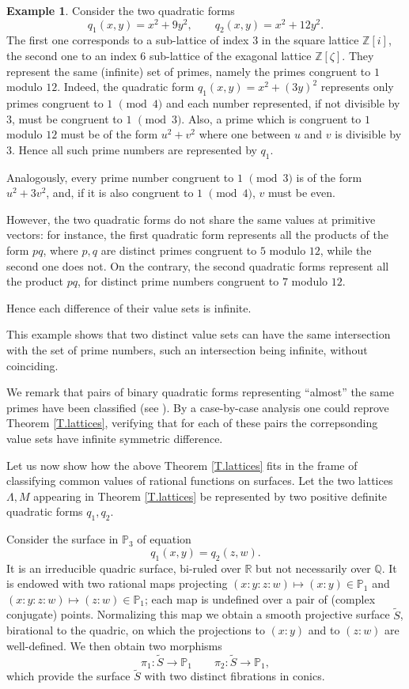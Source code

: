 \documentclass[leqno,12pt]{article} %
\def\Z{{{\mathbb Z}}}
\def\Q{{{\mathbb Q}}}
\def\R{{{\mathbb R}}}
\def\P{{{\mathbb P}}}
\theoremstyle{plain} %
\theoremstyle{definition} %
\newtheorem{example}[theorem]{\indent\sc Example}
\begin{document}
\begin{example}\label{Ex.same-primes}
Consider the two quadratic forms 
$$
q_1(x,y)= x^2+9y^2,\qquad q_2(x,y)=x^2+12y^2.
$$
The first one corresponds to a sub-lattice of index $3$ in the square lattice $\Z[i]$, the second one to an index $6$ sub-lattice of the exagonal lattice $\Z[\zeta]$. They represent the same (infinite) set of primes, namely the primes congruent to $1$ modulo $12$. Indeed, the quadratic form $q_1(x,y)=x^2+(3y)^2$ represents only primes congruent to $1$ $\pmod 4$ and each number represented, if not divisible by $3$, must be congruent to $1$ $\pmod 3$. Also, a prime which is congruent to $1$ modulo $12$ must be of the form $u^2+v^2$ where one between $u$ and $v$ is divisible by $3$. Hence all such prime numbers are represented by $q_1$.

Analogously, every prime number congruent to $1$ $\pmod 3$ is of the form $u^2+3v^2$, and, if it is also congruent to $1$ $\pmod 4$, $v$ must be even.


However, the two quadratic forms do not share the same values at primitive vectors: for instance, the first quadratic form represents all the products of the form $pq$, where $p,q$ are distinct primes congruent to $5$ modulo $ {  12}$, while the second one does not. On the contrary, the second quadratic forms represent all the product $pq$, for distinct prime numbers congruent to $7$ modulo $12$.

Hence each difference  of their value sets is infinite.

This example shows that two  distinct value sets can have the same  intersection with the set of prime numbers, such an intersection being infinite, without coinciding.
\end{example}

 
We remark that pairs of binary quadratic forms representing ``almost'' the same primes have been classified (see \cite{Voight}). By a case-by-case analysis one could reprove  Theorem \ref{T.lattices}, verifying that for each of these pairs  the correpsonding value sets have infinite symmetric difference.

\smallskip


Let us now show how the above Theorem \ref{T.lattices} fits in the frame of classifying common values of rational functions on surfaces. Let the two lattices $\Lambda, M$ appearing in Theorem \ref{T.lattices} be represented by two positive definite quadratic forms $q_1,q_2$. 

Consider the surface in $\P_3$ of equation 
$$
q_1(x,y)=q_2(z,w).
$$
It is an irreducible quadric surface, bi-ruled over $\R$ but not necessarily over $\Q$. It is endowed with two rational maps projecting $(x:y:z:w)\mapsto (x:y)\in\P_1$ and $(x:y:z:w)\mapsto (z:w)\in\P_1$; each map is undefined over a pair of (complex conjugate) points. Normalizing this map we obtain a smooth projective surface $\tilde{S}$, birational to the quadric, on which the projections to $(x:y)$ and to $(z:w)$ are well-defined. We then obtain two morphisms 
$$
\pi_1: \tilde{S}\to \P_{1} \qquad  \pi_2: \tilde{S}\to \P_{1},
$$
which provide the surface  $\tilde{S}$ with two distinct fibrations in conics.
\end{document}

